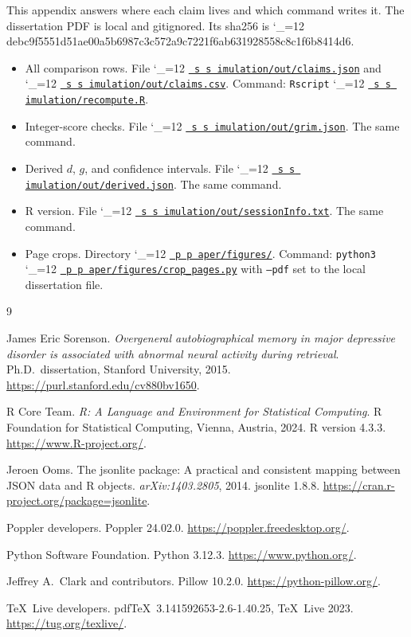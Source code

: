 \documentclass[11pt]{article}
\makeatletter
\newcommand{\sha}{\begingroup\catcode`\_=12 \sha@read}
\newcommand{\sha@read}[1]{\ttfamily\sha@loop#1\relax\endgroup}
\def\sha@loop#1{%
  \ifx\relax#1\else
    #1\allowbreak
    \expandafter\sha@loop
  \fi}
\def\ogm@show#1{%
  \ifx\relax#1\else
    #1\allowbreak
    \expandafter\ogm@show
  \fi}
\newcommand{\src}{\begingroup\catcode`\_=12 \ogm@src}
\newcommand{\ogm@src}[1]{%
  \edef\srcurl{https://github.com/alectionary/vibe-math/blob/master/formalization/overgeneral-memory/#1}%
  \href{\srcurl}{\texttt{\ogm@show#1\relax}}\endgroup}
\newcommand{\srcat}{\begingroup\catcode`\_=12 \ogm@srcat}
\newcommand{\ogm@srcat}[2]{%
  \edef\srcurl{https://github.com/alectionary/vibe-math/blob/master/formalization/overgeneral-memory/#1\#L#2}%
  \href{\srcurl}{\texttt{\ogm@show#1\relax}}\endgroup}
\makeatother
\begin{document}
This appendix answers where each claim lives and which command writes it.
The dissertation PDF is local and gitignored.
Its sha256 is
\sha{4debc9f5551d51ae00a5b6987c3c572a9c7221f6ab631928558c8c1f6b8414d6}.

\begin{itemize}
\item All comparison rows.
File \src{simulation/out/claims.json} and \src{simulation/out/claims.csv}.
Command: \texttt{Rscript} \src{simulation/recompute.R}.
\item Integer-score checks.
File \src{simulation/out/grim.json}.
The same command.
\item Derived \(d\), \(g\), and confidence intervals.
File \src{simulation/out/derived.json}.
The same command.
\item R version.
File \src{simulation/out/sessionInfo.txt}.
The same command.
\item Page crops.
Directory \src{paper/figures/}.
Command: \texttt{python3} \srcat{paper/figures/crop_pages.py}{72}
with \texttt{--pdf} set to the local dissertation file.
\end{itemize}

\begin{thebibliography}{9}

James Eric Sorenson.
\emph{Overgeneral autobiographical memory in major depressive disorder is
associated with abnormal neural activity during retrieval}.
Ph.D.\ dissertation, Stanford University, 2015.
\url{https://purl.stanford.edu/cv880bv1650}.

R Core Team.
\emph{R: A Language and Environment for Statistical Computing}.
R Foundation for Statistical Computing, Vienna, Austria, 2024.
R version 4.3.3.
\url{https://www.R-project.org/}.

Jeroen Ooms.
The jsonlite package: A practical and consistent mapping between JSON data
and R objects.
\emph{arXiv:1403.2805}, 2014.
jsonlite 1.8.8.
\url{https://cran.r-project.org/package=jsonlite}.

Poppler developers.
Poppler 24.02.0.
\url{https://poppler.freedesktop.org/}.

Python Software Foundation.
Python 3.12.3.
\url{https://www.python.org/}.

Jeffrey A.\ Clark and contributors.
Pillow 10.2.0.
\url{https://python-pillow.org/}.

\TeX\ Live developers.
pdf\TeX\ 3.141592653-2.6-1.40.25, \TeX\ Live 2023.
\url{https://tug.org/texlive/}.

\end{thebibliography}
\end{document}
